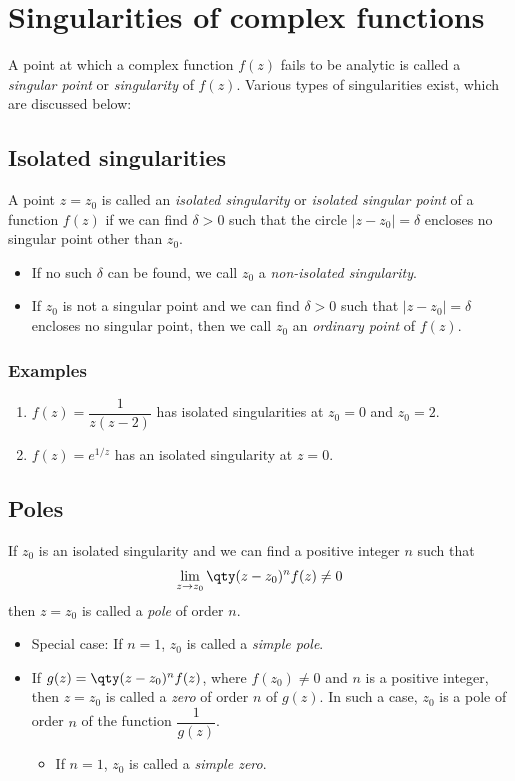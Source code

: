 \section{Singularities of complex functions}
	A point at which a complex function $f(z)$ fails to be analytic is called a \emph{singular point} or \emph{singularity} of $f(z)$. Various types of singularities exist, which are discussed below:
	
	\subsection{Isolated singularities}
		A point $z=z_0$ is called an \emph{isolated singularity} or \emph{isolated singular point} of a function $f(z)$ if we can find $\delta>0$ such that the circle $|z-z_0|=\delta$ encloses no singular point other than $z_0$.
		\begin{itemize}
			\item If no such $\delta$ can be found, we call $z_0$ a \emph{non-isolated singularity}.
			\item If $z_0$ is not a singular point and we can find $\delta>0$ such that $|z-z_0|=\delta$ encloses no singular
			point, then we call $z_0$ an \emph{ordinary point} of $f(z)$.
		\end{itemize}
		\subsubsection*{Examples}
			\begin{enumerate}
				\item $f(z)=\dfrac{1}{z(z-2)}$ has isolated singularities at $z_0=0$ and $z_0=2$.
				
				\item $f(z)=e^{1/z}$ has an isolated singularity at $z=0$.
			\end{enumerate}

	\subsection{Poles}
		If $z_0$ is an isolated singularity and we can find a positive integer $n$ such that
		\begin{align*}
			\lim_{z\to z_0}{\qty(z-z_0)^nf(z)\neq 0}
		\end{align*}
		then $z=z_0$ is called a \emph{pole} of order $n$.
		
		\begin{itemize}
			\item Special case: If $n=1$, $z_0$ is called a \emph{simple pole}.
			\item If $g(z)=\qty(z-z_0)^nf(z)$, where $f(z_0)\neq 0$ and $n$ is a positive integer, then $z=z_0$ is called a \emph{zero} of
			order $n$ of $g(z)$. In such a case, $z_0$ is a pole of order $n$ of the function $\dfrac{1}{g(z)}$.
			\begin{itemize}
				\item If $n=1$, $z_0$ is called a \emph{simple zero}.
			\end{itemize}
		\end{itemize}
		
